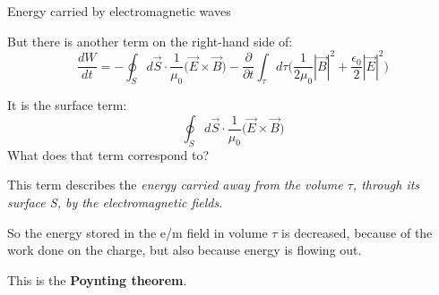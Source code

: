 \begin{frame}{Energy carried by electromagnetic waves}

But there is another term on the right-hand side of:
\begin{equation*}
  \frac{dW}{dt} =
     - \oint_{S} d\vec{S} \cdot \frac{1}{\mu_0} \Big( \vec{E} \times \vec{B} \Big)
     - \frac{\partial}{\partial t} \int_{\tau} d\tau  \Big( \frac{1}{2\mu_0} |\vec{B}|^2 + \frac{\epsilon_0}{2} |\vec{E}|^2 \Big)
\end{equation*}

It is the surface term:
\begin{equation*}
     \oint_{S} d\vec{S} \cdot \frac{1}{\mu_0} \Big( \vec{E} \times \vec{B} \Big)
\end{equation*}
What does that term correspond to?\\

\vspace{0.2cm}

This term describes the {\em energy carried away from the volume $\tau$,
through its surface S, by the electromagnetic fields}.\\

\vspace{0.2cm}

So the energy stored in the e/m field in volume $\tau$ is decreased, because of the
work done on the charge, but also because energy is flowing out.\\

\vspace{0.2cm}

This is the {\bf Poynting theorem}.

\end{frame}
